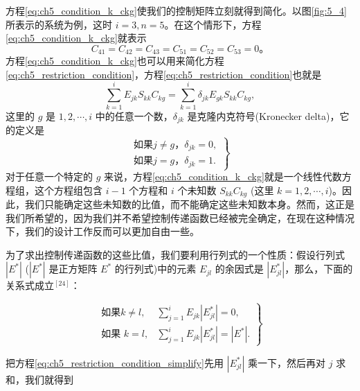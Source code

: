 方程\eqref{eq:ch5_condition_k_ckg}使我们的控制矩阵立刻就得到简化。以图\ref{fig:5_4}所表示的系统为例，这时 $i=3,n=5$。在这个情形下，方程\eqref{eq:ch5_condition_k_ckg}就表示
\begin{equation*}
C_{41} = C_{42} = C_{43} = C_{51} = C_{52} = C_{53} = 0。
\end{equation*}
方程\eqref{eq:ch5_condition_k_ckg}也可以用来简化方程\eqref{eq:ch5_restriction_condition}，方程\eqref{eq:ch5_restriction_condition}也就是
\begin{equation}\label{eq:ch5_restriction_condition_simplify}
\sum_{k=1}^i E_{jk} S_{kk} C_{kg} = \sum_{k=1}^i \delta_{jk} E_{gk} S_{kk} C_{kg},
\end{equation}
这里的 $g$ 是 $1,2,\cdots,i$ 中的任意一个数，$\delta_{jk}$ 是克隆内克符号(Kronecker delta)，它的定义是
\begin{equation}
\left.
\begin{array}{l}
\mbox{如果} j \neq g，\delta_{jk} = 0,\\
\mbox{如果} j = g，\delta_{jk} = 1.
\end{array}
\right\}
\end{equation}
对于任意一个特定的 $g$ 来说，方程\eqref{eq:ch5_condition_k_ckg}就是一个线性代数方程组，这个方程组包含 $i-1$ 个方程和 $i$ 个未知数 $S_{kk}C_{kg}$ (这里 $k=1,2,\cdots,i$)。因此，我们只能确定这些未知数的比值，而不能确定这些未知数本身。然而，这正是我们所希望的，因为我们并不希望控制传递函数已经被完全确定，在现在这种情况下，我们的设计工作反而可以更加自由一些。

为了求出控制传递函数的这些比值，我们要利用行列式的一个性质：假设行列式 $\left| E^* \right|$ ($\left| E^* \right|$ 是正方矩阵 $E^*$ 的行列式)中的元素 $E_{jl}$ 的余因式是 $\left| E_{jl}^* \right|$，那么，下面的关系式成立$^{[24]}$：

\begin{equation}\label{eq:ch5_determinant_property}
\left.
\begin{array}{ll}
\text{如果} k \neq l, & \sum_{j=1}^{i} E_{jk} | E_{jl}^* | = 0, \\
\text{如果 } k = l, & \sum_{j=1}^{i} E_{jk} | E_{jl}^* | = | E^* |.
\end{array}
\right\}
\end{equation}

把方程\eqref{eq:ch5_restriction_condition_simplify}先用 $\left| E_{jl}^* \right|$ 乘一下，然后再对 $j$ 求和，我们就得到

